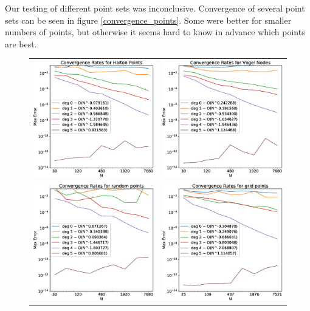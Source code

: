 \documentclass[12pt]{article}
\begin{document}
	Our testing of different point sets was inconclusive. Convergence of several point sets can be seen in figure \ref{convergence_points}. Some were better for smaller numbers of points, but otherwise it seems hard to know in advance which points are best.
	\begin{figure}[ht]
		\centering
		\begin{tabular}{cc}
			\includegraphics[width=.5\textwidth]{Convergence_halton.eps} & \includegraphics[width=.5\textwidth]{convergence_vogel.eps} \\
			\includegraphics[width=.5\textwidth]{Convergence_random.eps} & \includegraphics[width=.5\textwidth]{Convergence_grid.eps} \\

\end{tabular}
\end{figure}
\end{document}
